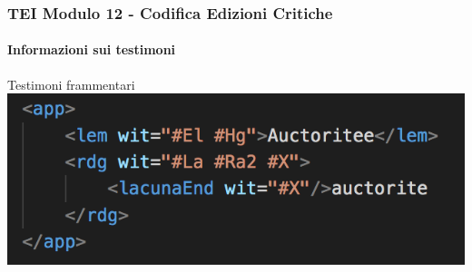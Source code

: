 \begin{frame}
    \frametitle{TEI Modulo 12 - Codifica Edizioni Critiche}
    \framesubtitle{Informazioni sui testimoni}
    \addtocounter{nframe}{1}
    






    \begin{block}{Testimoni frammentari}
       \includegraphics[width=.95\textwidth]{imgs/rdg-lacunaEnd.png}
    \end{block}



\end{frame}

